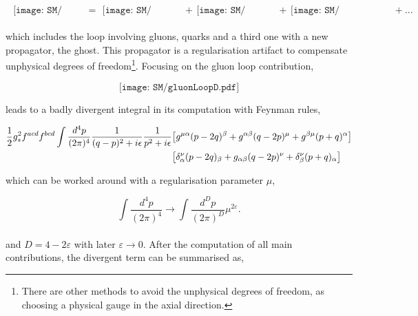 \begin{align}
    \begin{gathered}
        \texttt{[image: SM/gluonSEC.pdf]}
    \end{gathered}&=\begin{gathered}\texttt{[image: SM/gluonLoopC.pdf]}
    \end{gathered}&+\begin{gathered}\texttt{[image: SM/gluonLoopA.pdf]}
    \end{gathered}&+\begin{gathered}\texttt{[image: SM/gluonLoopB.pdf]}
    \end{gathered}+ ...
    \end{align}


which includes the loop involving gluons, quarks and a third one with a new propagator, the ghost. This propagator is a regularisation artifact to compensate unphysical degrees of freedom\footnote{There are other methods to avoid the unphysical degrees of freedom, as choosing a physical gauge in the axial direction.}. Focusing on the gluon loop contribution,

\begin{equation}
\texttt{[image: SM/gluonLoopD.pdf]}
\end{equation}

leads to a badly divergent integral in its computation with Feynman rules,  

\begin{align}
    \begin{split} 
        \frac{1}{2}g_s^2f^{acd}f^{bcd}\int\frac{d^4p}{(2\pi)^4} \frac{1}{(q-p)^2+i\epsilon}\frac{1}{p^2+i\epsilon}&\qty[g^{\mu\alpha}(p-2q)^\beta+g^{\alpha\beta}(q-2p)^\mu+g^{\beta\mu}(p+q)^\alpha]\\
       &\qty[\delta_\alpha^\nu(p-2q)_\beta+g_{\alpha\beta}(q-2p)^\nu+\delta_\beta^\nu(p+q)_\alpha]
       \label{ipi}
    \end{split}
    \end{align}

which can be worked around with a regularisation parameter $\mu$,

\begin{equation*}
    \int \frac{d^4p}{(2\pi)^4}\to \int \frac{d^Dp}{(2\pi)^D}\mu^{2\varepsilon}.
\end{equation*}\\

and $D=4-2\varepsilon$ with later $\varepsilon\to 0$. After the computation of all main contributions, the divergent term can be summarised as,

